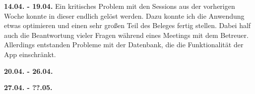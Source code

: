 \documentclass[nomenclature, oneside, 150]{HSMW-Thesis}
\begin{document}
	\textbf{14.04. - 19.04.}
	Ein kritisches Problem mit den Sessions aus der vorherigen Woche konnte in dieser endlich gelöst werden. Dazu konnte ich die Anwendung etwas optimieren und einen sehr großen Teil des Beleges fertig stellen. Dabei half auch die Beantwortung vieler Fragen während eines Meetings mit dem Betreuer. Allerdings entstanden Probleme mit der Datenbank, die die Funktionalität der App einschränkt.
	
	\textbf{20.04. - 26.04.}
	
	\textbf{27.04. - ??.05.}




\end{document}
